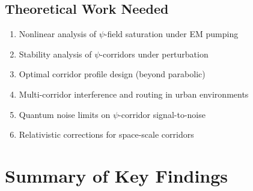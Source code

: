 \documentclass[11pt,a4paper]{article}
\begin{document}
\subsection{Theoretical Work Needed}

\begin{enumerate}
\item Nonlinear analysis of $\psi$-field saturation under EM pumping
\item Stability analysis of $\psi$-corridors under perturbation
\item Optimal corridor profile design (beyond parabolic)
\item Multi-corridor interference and routing in urban environments
\item Quantum noise limits on $\psi$-corridor signal-to-noise
\item Relativistic corrections for space-scale corridors
\end{enumerate}

\section{Summary of Key Findings}
\end{document}
